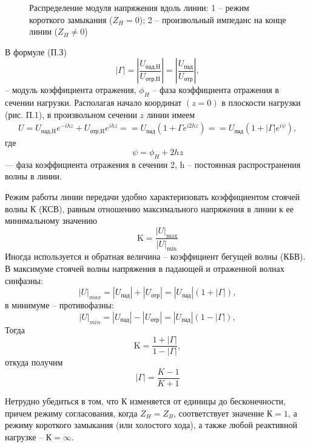 \documentclass[a4paper,12pt]{article}
\begin{document}
\begin{figure}[h!]
	\centering
	\caption{Распределение модуля напряжения вдоль линии: 1 -- режим короткого замыкания ($Z_H=0$); 2 -- произвольный импеданс на конце линии ($Z_H\ne0$)}
	\label{fig:p1}
\end{figure}
В формуле (П.З)
\begin{equation}
	|\Gamma|=\left|\frac{U_\text{пад,H}}{U_\text{отр,H}}\right|=\left|\frac{U_\text{пад}}{U_\text{отр}}\right|,
\end{equation}
-- модуль коэффициента отражения, $\phi_H$ -- фаза коэффициента отражения в сечении нагрузки. Располагая начало координат $(z = 0)$ в плоскости нагрузки (рис. П.1), в произвольном сечении $z$ линии имеем
\begin{gather}
	U=U_\text{пад,H}e^{-ihz}+U_\text{отр,H}e^{ihz}=
		=U_\text{пад}(1+\Gamma e^{i2hz})=
		=U_\text{пад}(1+|\Gamma|e^{i\psi}),
\end{gather}
где
\begin{equation}
	\psi=\phi_H+2hz
\end{equation}
--- фаза коэффициента отражения в сечении 2, h -- постоянная распространения волны в линии.

Режим работы линии передачи удобно характеризовать коэффициентом стоячей волны К (КСВ), равным отношению максимального напряжения в линии к ее минимальному значению
\begin{equation}
	\mathrm { K } = \frac { | U | _ { \max } } { | U | _ { \min } }
\end{equation}
Иногда используется и обратная величина -- коэффициент бегущей волны (КБВ). В максимуме стоячей волны напряжения в падающей и отраженной волнах синфазны:
\begin{equation}
	|U|_{max}=|U_\text{пад}|+|U_\text{отр}|=|U_\text{пад}|(1+|\Gamma|),
\end{equation}
в минимуме -- противофазны:
\begin{equation}
	|U|_{min}=|U_\text{пад}|-|U_\text{отр}|=|U_\text{пад}|(1-|\Gamma|),
\end{equation}
Тогда
\begin{equation}
	\mathrm { K } = \frac { 1 + | \Gamma | } { 1 - | \Gamma | },
\end{equation}
откуда получим
\begin{equation}
	| \Gamma | = \frac { K - 1 } { K + 1 }
\end{equation}

Нетрудно убедиться в том, что К изменяется от единицы до бесконечности, причем режиму согласования, когда $Z_H = Z_B$, соответствует значение $\mathrm{К}=1$, а режиму короткого замыкания (или холостого хода), а также любой реактивной нагрузке -- $\mathrm{К}=\infty$.
\end{document}
